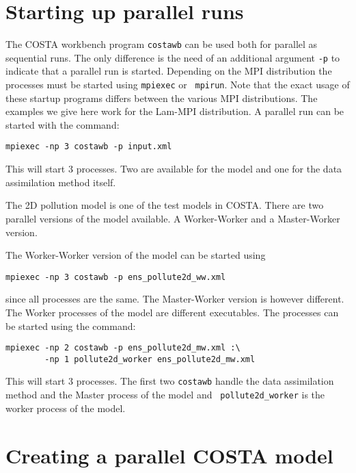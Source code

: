 \section{Starting up parallel runs}
The COSTA workbench program {\tt costawb} can be used both for parallel as
sequential runs. The only difference is the need of an additional argument
{\tt -p} to indicate that a parallel run is started. Depending on the MPI
distribution the processes must be started using {\tt mpiexec} or {\tt
mpirun}. Note that the exact usage of these startup programs differs between the
various MPI distributions. The examples we give here work for the Lam-MPI
distribution. A parallel run can be started with the command:
\begin{verbatim}
mpiexec -np 3 costawb -p input.xml
\end{verbatim}
This will start 3 processes. Two are available for the model and one for
the data assimilation method itself.

The 2D pollution model is one of the test models in COSTA. There are two
parallel versions of the model available. A Worker-Worker and a
Master-Worker version.

The Worker-Worker version of the model can be started using 
\begin{verbatim}
mpiexec -np 3 costawb -p ens_pollute2d_ww.xml
\end{verbatim}
since all processes are the same. The Master-Worker version is however
different. The Worker processes of the model are different executables.
The processes can be started using the command:
\begin{verbatim}
mpiexec -np 2 costawb -p ens_pollute2d_mw.xml :\
        -np 1 pollute2d_worker ens_pollute2d_mw.xml
\end{verbatim}
This will start 3 processes. The first two {\tt costawb} handle the data
assimilation method and the Master process of the model and {\tt
pollute2d\_worker} is the worker process of the model.

\section{Creating a parallel COSTA model}
